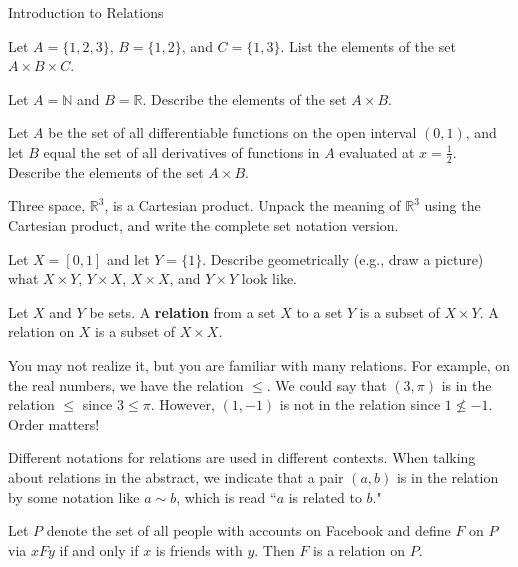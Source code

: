 \begin{section}{Introduction to Relations}
\begin{exercise} 
Let $A=\{1, 2, 3\}$, $B=\{1,2\}$, and $C=\{1,3\}$. List the elements of the set $A \times B\times C$. 
\end{exercise}

\begin{exercise}
Let $A=\mathbb{N}$ and $B=\mathbb{R}$. Describe the elements of the set $A \times B$. 
\end{exercise}

\begin{exercise} Let $A$ be the set of all differentiable functions on the open interval $(0,1)$, and let $B$ equal the set of all derivatives of functions in $A$ evaluated at $x=\frac{1}{2}$. Describe the elements of the set $A \times B$.
\end{exercise}

\begin{exercise}
Three space, $\mathbb{R}^{3}$, is a Cartesian product.  Unpack the meaning of $\mathbb{R}^{3}$ using the Cartesian product, and write the complete set notation version.
\end{exercise}

\begin{exercise}
Let $X=[0,1]$ and let $Y=\{1\}$.  Describe geometrically (e.g., draw a picture) what $X\times Y$, $Y\times X$, $X\times X$, and $Y\times Y$ look like.
\end{exercise}

\begin{definition}
Let $X$ and $Y$ be sets. A \textbf{relation} from a set $X$ to a set $Y$ is a subset of $X \times Y$. A relation on $X$ is a subset of $X \times X$.  
\end{definition}

\begin{example}
You may not realize it, but you are familiar with many relations.  For example, on the real numbers, we have the relation $\leq$.  We could say that $(3,\pi)$ is in the relation $\leq$ since $3\leq \pi$.  However, $(1,-1)$ is not in the relation since $1\nleq -1$.  Order matters!
\end{example}

Different notations for relations are used in different contexts.  When talking about relations in the abstract, we indicate that a pair $(a,b)$ is in the relation by some notation like $a\sim b$, which is read ``$a$ is related to $b$."

\begin{example}
Let $P$ denote the set of all people with accounts on Facebook and define $F$ on $P$ via $xFy$ if and only if $x$ is friends with $y$.  Then $F$ is a relation on $P$.
\end{example}


\end{section}
